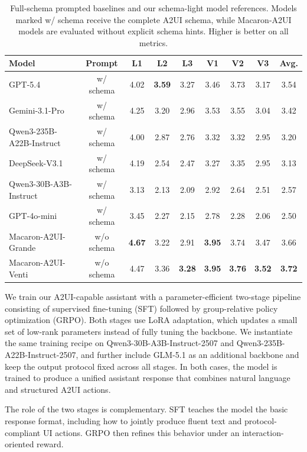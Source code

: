 \documentclass{llmxive}
\begin{document}
\begin{table}[t]
\centering
\small
\setlength{\tabcolsep}{5pt}
\begin{tabular}{l|c|ccc|ccc|c}
\toprule
Model & Prompt & L1 & L2 & L3 & V1 & V2 & V3 & Avg. \\
\midrule
GPT-5.4 & w/ schema & 4.02 & \textbf{3.59} & 3.27 & 3.46 & 3.73 & 3.17 & 3.54 \\
Gemini-3.1-Pro & w/ schema & 4.25 & 3.20 & 2.96 & 3.53 & 3.55 & 3.04 & 3.42 \\
Qwen3-235B-A22B-Instruct & w/ schema & 4.00 & 2.87 & 2.76 & 3.32 & 3.32 & 2.95 & 3.20 \\ 
DeepSeek-V3.1 & w/ schema& 4.19 & 2.54 & 2.47 & 3.27 & 3.35 & 2.95 & 3.13 \\
Qwen3-30B-A3B-Instruct & w/ schema & 3.13 & 2.13 & 2.09 & 2.92 & 2.64 & 2.51 & 2.57 \\
GPT-4o-mini & w/ schema & 3.45 & 2.27 & 2.15 & 2.78 & 2.28 & 2.06 & 2.50 \\
\midrule
Macaron-A2UI-Grande & w/o schema & \textbf{4.67} & 3.22 & 2.91 & \textbf{3.95} & 3.74 & 3.47 & 3.66 \\
Macaron-A2UI-Venti & w/o schema & 4.47 &3.36 &\textbf{3.28} &\textbf{3.95} & \textbf{3.76} &\textbf{3.52} & \textbf{3.72} \\
\bottomrule
\end{tabular}
\caption{Full-schema prompted baselines and our schema-light model references. Models marked w/ schema receive the complete A2UI schema, while Macaron-A2UI models are evaluated without explicit schema hints. Higher is better on all metrics.}
\label{tab:full_prompt_results}
\end{table}

We train our A2UI-capable assistant with a parameter-efficient two-stage pipeline consisting of supervised fine-tuning (SFT) followed by group-relative policy optimization (GRPO). Both stages use LoRA adaptation, which updates a small set of low-rank parameters instead of fully tuning the backbone. We instantiate the same training recipe on Qwen3-30B-A3B-Instruct-2507 and Qwen3-235B-A22B-Instruct-2507, and further include GLM-5.1 as an additional backbone and keep the output protocol fixed across all stages. In both cases, the model is trained to produce a unified assistant response that combines natural language and structured A2UI actions.

The role of the two stages is complementary. SFT teaches the model the basic response format, including how to jointly produce fluent text and protocol-compliant UI actions. GRPO then refines this behavior under an interaction-oriented reward.
\end{document}

